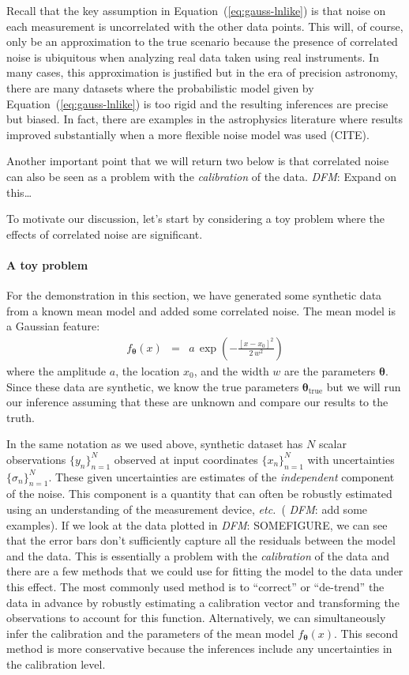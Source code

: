 \documentclass[12pt,preprint]{aastex}
\newcommand{\foreign}[1]{\emph{#1}}
\newcommand{\etc}{\foreign{etc.}}
\newcommand{\Eq}[1]{Equation~(\ref{eq:#1})}
\newcommand{\eq}[1]{\Eq{#1}}
\newcommand{\eqlabel}[1]{\label{eq:#1}}
\newcommand{\bvec}[1]{{\ensuremath{\boldsymbol{#1}}}}
\newcommand{\todo}[3]{{\color{#2} \emph{#1}: #3}}
\newcommand{\dfmtodo}[1]{\todo{DFM}{red}{#1}}
\newcommand{\params}{{\ensuremath{\boldsymbol{\theta}}}}
\begin{document}
Recall that the key assumption in \eq{gauss-lnlike} is that noise on each
measurement is uncorrelated with the other data points.
This will, of course, only be an approximation to the true scenario because
the presence of correlated noise is ubiquitous when analyzing real data taken
using real instruments.
In many cases, this approximation is justified but in the era of precision
astronomy, there are many datasets where the probabilistic model given by
\eq{gauss-lnlike} is too rigid and the resulting inferences are precise but
biased.
In fact, there are examples in the astrophysics literature where results
improved substantially when a more flexible noise model was used (CITE).

Another important point that we will return two below is that correlated noise
can also be seen as a problem with the \emph{calibration} of the data.
\dfmtodo{Expand on this\ldots}

To motivate our discussion, let's start by considering a toy problem where the
effects of correlated noise are significant.

\paragraph{A toy problem}
For the demonstration in this section, we have generated some synthetic data
from a known mean model and added some correlated noise.
The mean model is a Gaussian feature:
\begin{eqnarray}\eqlabel{demo-base-model}
f_\bvec{\theta}(x) &=& a\,\exp\left(-\frac{[x - x_0]^2}{2\,w^2}\right)
\end{eqnarray}
where the amplitude $a$, the location $x_0$, and the width $w$ are the
parameters \params.
Since these data are synthetic, we know the true parameters
$\params_\mathrm{true}$ but we will run our inference assuming that
these are unknown and compare our results to the truth.

In the same notation as we used above, synthetic dataset has $N$ scalar
observations $\{y_n\}_{n=1}^N$ observed at input coordinates $\{x_n\}_{n=1}^N$
with uncertainties $\{\sigma_n\}_{n=1}^N$.
These given uncertainties are estimates of the \emph{independent} component of
the noise.
This component is a quantity that can often be robustly estimated using an
understanding of the measurement device, \etc\ (\dfmtodo{add some examples}).
If we look at the data plotted in \dfmtodo{SOMEFIGURE}, we can see that the
error bars don't sufficiently capture all the residuals between the model and
the data.
This is essentially a problem with the \emph{calibration} of the data and
there are a few methods that we could use for fitting the model to the data
under this effect.
The most commonly used method is to ``correct'' or ``de-trend'' the data in
advance by robustly estimating a calibration vector and transforming the
observations to account for this function.
Alternatively, we can simultaneously infer the calibration and the parameters
of the mean model $f_\params(x)$.
This second method is more conservative because the inferences include any
uncertainties in the calibration level.
\end{document}
